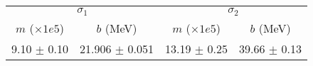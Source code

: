 \begin{tabular}{cc|cc}
\multicolumn{2}{c|}{$\sigma_1$} & \multicolumn{2}{|c}{$\sigma_2$} \\
$m$ ($\times1e5$) & $b$ (MeV) & $m$ ($\times1e5$) & $b$ (MeV) \\
\hline
9.10 $\pm$ 0.10 & 21.906 $\pm$ 0.051 & 13.19 $\pm$ 0.25 & 39.66 $\pm$ 0.13\\
\end{tabular}
